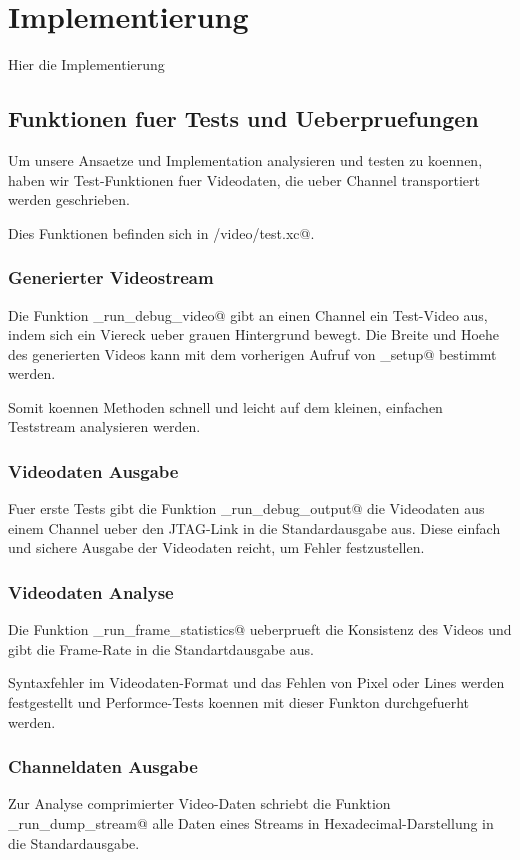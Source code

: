 
\chapter{Implementierung}
Hier die Implementierung

\section{Funktionen fuer Tests und Ueberpruefungen}
Um unsere Ansaetze und Implementation analysieren und testen zu koennen,
haben wir Test-Funktionen fuer Videodaten, die ueber Channel transportiert
werden geschrieben.

Dies Funktionen befinden sich in \verb@board/video/test.xc@.

\subsection{Generierter Videostream}
Die Funktion \lstinline@tst_run_debug_video@ gibt an einen Channel ein Test-Video aus,
indem sich ein Viereck ueber grauen Hintergrund bewegt.
Die Breite und Hoehe des generierten Videos kann mit dem vorherigen Aufruf von
\lstinline@tst_setup@ bestimmt werden. 

Somit koennen Methoden schnell und leicht auf dem kleinen, einfachen
Teststream analysieren werden.

\subsection{Videodaten Ausgabe}
Fuer erste Tests gibt die Funktion \lstinline@tst_run_debug_output@ die
Videodaten aus einem Channel ueber den JTAG-Link in die Standardausgabe aus.
Diese einfach und sichere Ausgabe der Videodaten reicht, um Fehler
festzustellen.

\subsection{Videodaten Analyse}
Die Funktion \lstinline@tst_run_frame_statistics@ ueberprueft die Konsistenz des
Videos und gibt die Frame-Rate in die Standartdausgabe aus.

Syntaxfehler im Videodaten-Format und das Fehlen von Pixel oder Lines 
werden festgestellt und Performce-Tests koennen mit dieser Funkton durchgefuerht
werden.

\subsection{Channeldaten Ausgabe}
Zur Analyse comprimierter Video-Daten schriebt die Funktion 
\lstinline@tst_run_dump_stream@ alle Daten eines Streams in
Hexadecimal-Darstellung in die Standardausgabe.


